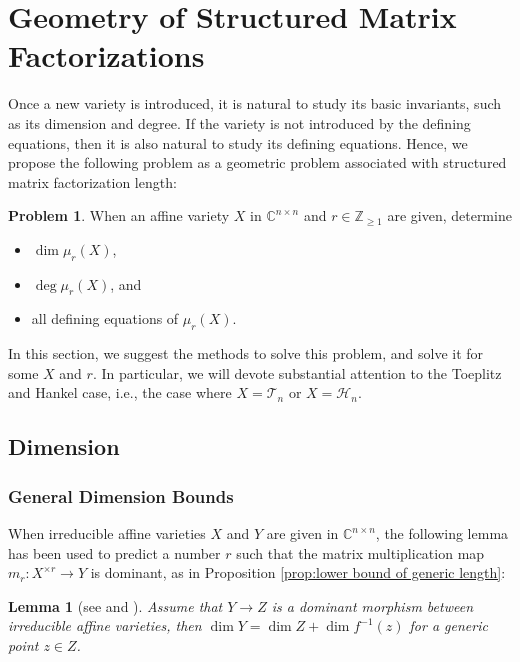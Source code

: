 \documentclass[reqno]{amsart}
\newtheorem{lemma}[theorem]{Lemma}
\theoremstyle{definition}
\newtheorem{problem}[theorem]{Problem}
\numberwithin{equation}{section}
\begin{document}
\section{Geometry of Structured Matrix Factorizations}\label{section:Geometry of Structured Matrix Factorizations}

Once a new variety is introduced, it is natural to study its basic invariants, such as its dimension and degree. If the variety is not introduced by the defining equations, then it is also natural to study its defining equations. Hence, we propose the following problem as a geometric problem associated with structured matrix factorization length:

\begin{problem}\label{problem:main problems on the geometry of structured matrix factorization length}
    When an affine variety $X$ in $\mathbb{C}^{n \times n}$ and $r \in \mathbb{Z}_{\geq 1}$ are given, determine
    \begin{itemize}
        \item [(\romannumeral1)] $\dim \mu_r(X)$,
        \item [(\romannumeral2)] $\deg \mu_r(X)$, and
        \item [(\romannumeral3)] all defining equations of $\mu_r(X)$.
    \end{itemize}
\end{problem}

In this section, we suggest the methods to solve this problem, and solve it for some $X$ and $r$. In particular, we will devote substantial attention to the Toeplitz and Hankel case, i.e., the case where $X=\mathcal{T}_n$ or $X=\mathcal{H}_n$. 

\subsection{Dimension} \label{subsection:Dimension}

\subsubsection{General Dimension Bounds}

When irreducible affine varieties $X$ and $Y$ are given in $\mathbb{C}^{n \times n}$, the following lemma has been used to predict a number $r$ such that the matrix multiplication map $m_r:X^{\times r} \rightarrow Y$ is dominant, as in Proposition \ref{prop:lower bound of generic length}:

\begin{lemma}[see {\cite[Theorem 1.25]{shafarevich1994basic} and \cite[Proposition 3.2]{ye2017new}}]\label{lemma:fiber dimension}
    Assume that $Y \rightarrow Z$ is a dominant morphism between irreducible affine varieties, then $\dim Y = \dim Z + \dim f^{-1}(z)$ for a generic point $z \in Z$.
\end{lemma}
\end{document}
